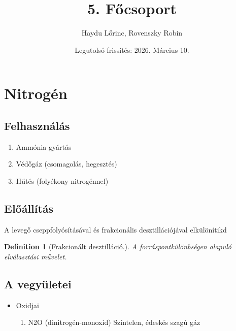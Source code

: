 \documentclass{article}
\title{5. Főcsoport}
\author{Haydu Lőrinc, Rovenszky Robin}
\date{Legutolsó frissítés: 2026. Március 10.}
\newtheorem{definition}{Definition}[section]
\begin{document}
\maketitle

\section{Nitrogén}
\subsection{Felhasználás}
\begin{enumerate}
    \item Ammónia gyártás
    \item Védőgáz (csomagolás, hegesztés)
    \item Hűtés (folyékony nitrogénnel)

\end{enumerate}
\subsection{Előállítás} 
A levegő cseppfolyósításával és frakcionális desztillációjával elkülönítikd

\begin{definition}[Frakcionált desztilláció.]
A forráspontkülönbségen alapuló elválasztási művelet.
\end{definition}

\subsection{A vegyületei}

\begin{itemize}
    \item Oxidjai
    \begin{enumerate}
        \item N2O (dinitrogén-monoxid)
        Színtelen, édeskés szagú gáz
    \end{enumerate}
\end{itemize}
\end{document}
